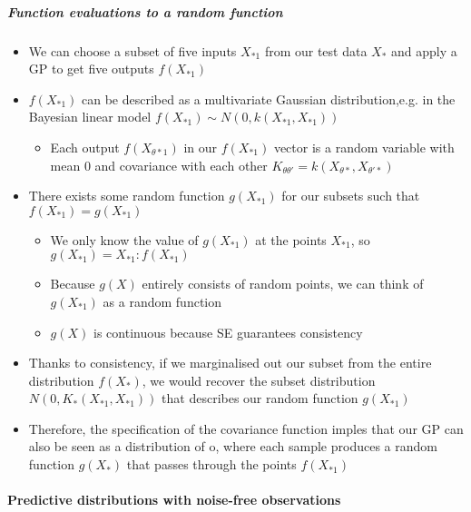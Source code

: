 \documentclass[12pt]{article}
\begin{document}
\subparagraph{Function evaluations to a random function}
\begin{itemize}
    \item We can choose a subset of five inputs $X_{*1}$ from our test data $X_*$ and apply a GP to get five outputs $f(X_{*1})$
    \item $f(X_{*1})$ can be described as a multivariate Gaussian distribution,e.g. in the Bayesian linear model $f(X_{*1}) \sim N(0, k(X_{*1}, X_{*1}))$ 
        \begin{itemize}
            \item Each output $f(X_{\theta*1})$ in our $f(X_{*1})$ vector is a random variable with mean $0$ and covariance with each other $K_{\theta\theta'} = k(X_{\theta*}, X_{\theta'*})$ 
        \end{itemize}
    \item There exists some random function $g(X_{*1})$ for our subsets such that $f(X_{*1}) = g(X_{*1})$
    \begin{itemize}
        \item We only know the value of $g(X_{*1})$ at the points $X_{*1}$, so $g(X_{*1}) = {X_{*1} : f(X_{*1})}$
        \item Because $g(X)$ entirely consists of random points, we can think of $g(X_{*1})$ as a random function
        \item $g(X)$ is continuous because SE guarantees consistency
    \end{itemize}
\item Thanks to consistency, if we marginalised out our subset from the entire distribution $f(X_*)$, we would recover the subset distribution $N(0, K_*(X_{*1}, X_{*1}))$ that describes our random function $g(X_{*1})$
    \item Therefore, the specification of the covariance function imples that our GP can also be seen as a distribution of o, where each sample produces a random function $g(X_*)$ that passes through the points $f(X_{*1})$
\end{itemize}


\paragraph{Predictive distributions with noise-free observations}
\end{document}
